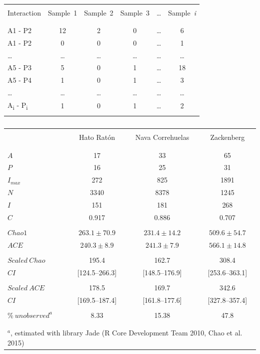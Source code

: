 \documentclass[12pt]{article}
\begin{document}
%
\newpage
\begin{table}[ht!]
  \caption{}
  \label{Table_3}
  \begin{center}
    \begin{tabular}{lccccc}
      \hline
\\Interaction&Sample\ 1&Sample\ 2&Sample\ 3&{\ldots}&Sample\ \emph{i}\\\\
      \hline
\\A1 - P2&12&2&0&{\ldots}&6\\
A1 - P2&0&0&0&{\ldots}&1\\
{\ldots}&{\ldots}&{\ldots}&{\ldots}&{\ldots}&{\ldots}\\
A5 - P3&5&0&1&{\ldots}&18\\
A5 - P4&1&0&1&{\ldots}&3\\
{\ldots}&{\ldots}&{\ldots}&{\ldots}&{\ldots}&{\ldots}\\
A\textsubscript{i} - P\textsubscript{i}&1&0&1&{\ldots}&2\\\\
      \hline
    \end{tabular}
  \end{center}
\end{table}
%
\newpage
\begin{table}[ht!]
  \caption{}
  \label{Table_4}
  \begin{center}
    \begin{tabular}{lccc}
      \hline
\\       &Hato Rat\'on  &  Nava Correhuelas&    Zackenberg\\\\
      \hline             
\\$A$&17&33&65\\
$P$&16&25&31\\
$I_{max}$&272&825&1891\\
$N$&3340&8378&1245\\
$I$&151&181&268\\
$C$&0.917&0.886&0.707\\\\
$Chao1$&$263.1\pm70.9$&$231.4\pm14.2$&$509.6\pm54.7$\\
$ACE$&$240.3\pm8.9$&$241.3\pm7.9$&$566.1\pm14.8$\\\\
$Scaled\ Chao$&195.4&162.7&308.4\\
$CI$&[124.5--266.3]&[148.5--176.9]&[253.6--363.1]\\\\
$Scaled\ ACE$&178.5&169.7&342.6\\
$CI$&[169.5--187.4]&[161.8--177.6]&[327.8--357.4]\\\\
$\%\ unobserved^a$&8.33&15.38&47.8\\\\
      \hline
\\\multicolumn{4}{l}{$^a$, estimated with library Jade (R Core Development Team 2010, Chao et al. 2015)}\\
    \end{tabular}
  \end{center}
\end{table}
\end{document}
